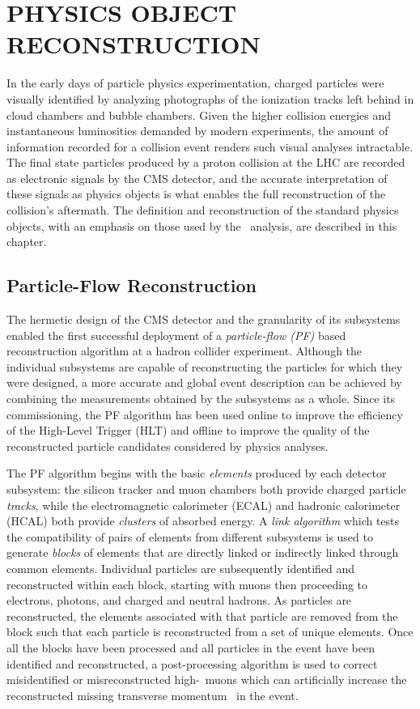 \chapter{PHYSICS OBJECT RECONSTRUCTION} \label{reco}

In the early days of particle physics experimentation, charged particles were visually identified by analyzing photographs of the ionization tracks left behind in cloud chambers and bubble chambers. Given the higher collision energies and instantaneous luminosities demanded by modern experiments, the amount of information recorded for a collision event renders such visual analyses intractable. The final state particles produced by a proton collision at the LHC are recorded as electronic signals by the CMS detector, and the accurate interpretation of these signals as physics objects is what enables the full reconstruction of the collision's aftermath. The definition and reconstruction of the standard physics objects, with an emphasis on those used by the \VHbb\ analysis, are described in this chapter.

\section{Particle-Flow Reconstruction}

The hermetic design of the CMS detector and the granularity of its subsystems enabled the first successful deployment of a \textit{particle-flow (PF)} based reconstruction algorithm at a hadron collider experiment.\cite{PARTICLEFLOW} Although the individual subsystems are capable of reconstructing the particles for which they were designed, a more accurate and global event description can be achieved by combining the measurements obtained by the subsystems as a whole. Since its commissioning, the PF algorithm has been used online to improve the efficiency of the High-Level Trigger (HLT) and offline to improve the quality of the reconstructed particle candidates considered by physics analyses.

The PF algorithm begins with the basic \textit{elements} produced by each detector subsystem: the silicon tracker and muon chambers both provide charged particle \textit{tracks}, while the electromagnetic calorimeter (ECAL) and hadronic calorimeter (HCAL) both provide \textit{clusters} of absorbed energy. A \textit{link algorithm} which tests the compatibility of pairs of elements from different subsystems is used to generate \textit{blocks} of elements that are directly linked or indirectly linked through common elements. Individual particles are subsequently identified and reconstructed within each block, starting with muons then proceeding to electrons, photons, and charged and neutral hadrons. As particles are reconstructed, the elements associated with that particle are removed from the block such that each particle is reconstructed from a set of unique elements. Once all the blocks have been processed and all particles in the event have been identified and reconstructed, a post-processing algorithm is used to correct misidentified or misreconstructed high-\pT\ muons which can artificially increase the reconstructed missing transverse momentum \pTmiss\ in the event.

